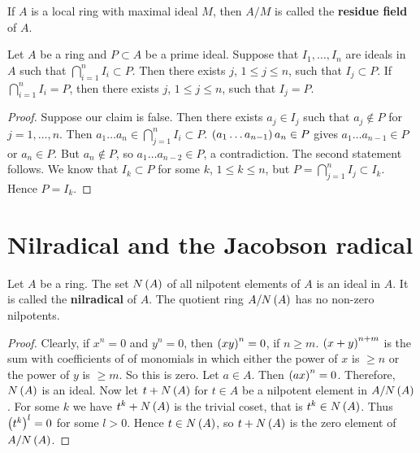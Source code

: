 If $ A $ is a local ring with maximal ideal $ M $, then $ A / M $ is called the \textbf{residue field} of $ A $.

\begin{lemma}
\label{lem:4.12}
Let $ A $ be a ring and $ P \subset A $ be a prime ideal. Suppose that $ I_1, \dots, I_n $ are ideals in $ A $ such that $ \bigcap_{i = 1}^n I_i \subset P $. Then there exists $ j $, $ 1 \le j \le n $, such that $ I_j \subset P $. If $ \bigcap_{i = 1}^n I_i = P $, then there exists $ j $, $ 1 \le j \le n $, such that $ I_j = P $.
\end{lemma}

\begin{proof}
Suppose our claim is false. Then there exists $ a_j \in I_j $ such that $ a_j \notin P $ for $ j = 1, \dots, n $. Then $ a_1 \dots a_n \in \bigcap_{j = 1}^n I_i \subset P $. $ \br{a_1 \dots a_{n - 1}}a_n \in P $ gives $ a_1 \dots a_{n - 1} \in P $ or $ a_n \in P $. But $ a_n \notin P $, so $ a_1 \dots a_{n - 2} \in P $, a contradiction. The second statement follows. We know that $ I_k \subset P $ for some $ k $, $ 1 \le k \le n $, but $ P = \bigcap_{j = 1}^n I_j \subset I_k $. Hence $ P = I_k $.
\end{proof}

\pagebreak

\section{Nilradical and the Jacobson radical}


\begin{proposition}
Let $ A $ be a ring. The set $ N\br{A} $ of all nilpotent elements of $ A $ is an ideal in $ A $. It is called the \textbf{nilradical} of $ A $. The quotient ring $ A / N\br{A} $ has no non-zero nilpotents.
\end{proposition}

\begin{proof}
Clearly, if $ x^n = 0 $ and $ y^n = 0 $, then $ \br{xy}^n = 0 $, if $ n \ge m $. $ \br{x + y}^{n + m} $ is the sum with coefficients of of monomials in which either the power of $ x $ is $ \ge n $ or the power of $ y $ is $ \ge m $. So this is zero. Let $ a \in A $. Then $ \br{ax}^n = 0 $. Therefore, $ N\br{A} $ is an ideal. Now let $ t + N\br{A} $ for $ t \in A $ be a nilpotent element in $ A / N\br{A} $. For some $ k $ we have $ t^k + N\br{A} $ is the trivial coset, that is $ t^k \in N\br{A} $. Thus $ \br{t^k}^l = 0 $ for some $ l > 0 $. Hence $ t \in N\br{A} $, so $ t + N\br{A} $ is the zero element of $ A / N\br{A} $.
\end{proof}

